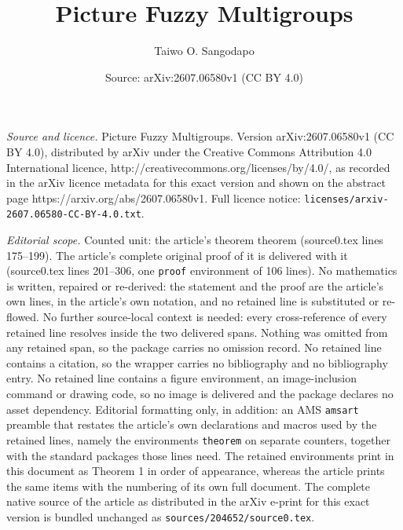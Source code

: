 \documentclass[10pt,a4paper]{amsart}
\title{Picture Fuzzy Multigroups}
\author{Taiwo O. Sangodapo}
\date{Source: arXiv:2607.06580v1 (CC BY 4.0)}
\begin{document}
\maketitle

\noindent\emph{Source and licence.} Picture Fuzzy Multigroups. Version arXiv:2607.06580v1 (CC BY 4.0), distributed by arXiv under the Creative Commons Attribution 4.0 International licence, http://creativecommons.org/licenses/by/4.0/, as recorded in the arXiv licence metadata for this exact version and shown on the abstract page https://arxiv.org/abs/2607.06580v1. Full licence notice: \texttt{licenses/arxiv-2607.06580-CC-BY-4.0.txt}.\par\smallskip

\noindent\textit{Editorial scope.} Counted unit: the article's theorem theorem (source0.tex lines 175--199). The article's complete original proof of it is delivered with it (source0.tex lines 201--306, one \texttt{proof} environment of 106 lines). No mathematics is written, repaired or re-derived: the statement and the proof are the article's own lines, in the article's own notation, and no retained line is substituted or re-flowed.  No further source-local context is needed: every cross-reference of every retained line resolves inside the two delivered spans.  Nothing was omitted from any retained span, so the package carries no omission record.  No retained line contains a citation, so the wrapper carries no bibliography and no bibliography entry.  No retained line contains a figure environment, an image-inclusion command or drawing code, so no image is delivered and the package declares no asset dependency.  Editorial formatting only, in addition: an AMS \texttt{amsart} preamble that restates the article's own declarations and macros used by the retained lines, namely the environments \texttt{theorem} on separate counters, together with the standard packages those lines need.  The retained environments print in this document as Theorem 1 in order of appearance, whereas the article prints the same items with the numbering of its own full document.  The complete native source of the article as distributed in the arXiv e-print for this exact version is bundled unchanged as \texttt{sources/204652/source0.tex}.
\end{document}

